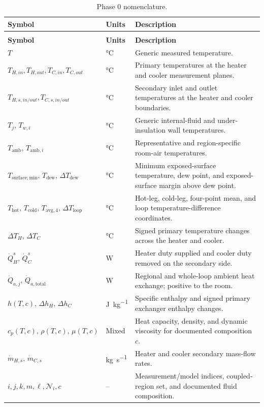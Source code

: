 \documentclass[11pt]{article}
\renewcommand{\arraystretch}{1.18}
\newcommand{\Tavg}{T_{\mathrm{avg},4}}
\newcommand{\Thot}{T_{\mathrm{hot}}}
\newcommand{\Tcold}{T_{\mathrm{cold}}}
\newcommand{\QHs}{\dot Q_{H}^{s}}
\newcommand{\QCs}{\dot Q_{C}^{s}}
\newcommand{\Tamb}{T_{\mathrm{amb}}}
\begin{document}
\begingroup
\footnotesize
\setlength{\LTpre}{4pt}
\setlength{\LTpost}{10pt}
\setlength{\tabcolsep}{4pt}
\renewcommand{\arraystretch}{1.10}
\begin{longtable}{@{}>{\raggedright\arraybackslash}p{1.78in}>{\raggedright\arraybackslash}p{1.08in}>{\raggedright\arraybackslash}p{3.62in}@{}}
\caption{Phase 0 nomenclature.}\label{tab:nomenclature}\\
\toprule
\textbf{Symbol} & \textbf{Units} & \textbf{Description} \\
\midrule
\endfirsthead
\multicolumn{3}{l}{\small\itshape Table~\ref{tab:nomenclature} continued from previous page}\\
\toprule
\textbf{Symbol} & \textbf{Units} & \textbf{Description} \\
\midrule
\endhead
\bottomrule
\endfoot
$T$ & \si{\degreeCelsius} & Generic measured temperature. \\
$T_{H,in},T_{H,out},T_{C,in},T_{C,out}$ & \si{\degreeCelsius} & Primary temperatures at the heater and cooler measurement planes. \\
$T_{H,s,in/out},T_{C,s,in/out}$ & \si{\degreeCelsius} & Secondary inlet and outlet temperatures at the heater and cooler boundaries. \\
$T_j,\,T_{w,i}$ & \si{\degreeCelsius} & Generic internal-fluid and under-insulation wall temperatures. \\
$\Tamb,\,T_{\mathrm{amb},i}$ & \si{\degreeCelsius} & Representative and region-specific room-air temperatures. \\
$T_{\mathrm{surface,min}},\,T_{\mathrm{dew}},\,\Delta T_{\mathrm{dew}}$ & \si{\degreeCelsius} & Minimum exposed-surface temperature, dew point, and exposed-surface margin above dew point. \\
$\Thot,\,\Tcold,\,\Tavg,\,\Delta T_{\mathrm{loop}}$ & \si{\degreeCelsius} & Hot-leg, cold-leg, four-point mean, and loop temperature-difference coordinates. \\
$\Delta T_H,\,\Delta T_C$ & \si{\degreeCelsius} & Signed primary temperature changes across the heater and cooler. \\
$\QHs,\,\QCs$ & \si{\watt} & Heater duty supplied and cooler duty removed on the secondary side. \\
$\dot Q_{a,j},\,\dot Q_{a,\mathrm{total}}$ & \si{\watt} & Regional and whole-loop ambient heat exchange; positive to the room. \\
$h(T,c),\,\Delta h_H,\,\Delta h_C$ & \si{\joule\per\kilogram} & Specific enthalpy and signed primary exchanger enthalpy changes. \\
$c_p(T,c),\,\rho(T,c),\,\mu(T,c)$ & Mixed & Heat capacity, density, and dynamic viscosity for documented composition $c$. \\
$\dot m_{H,s},\,\dot m_{C,s}$ & \si{\kilogram\per\second} & Heater and cooler secondary mass-flow rates. \\
$i,j,k,m,\ell,\mathcal N_i,c$ & -- & Measurement/model indices, coupled-region set, and documented fluid composition. \\
\end{longtable}
\endgroup
\end{document}
